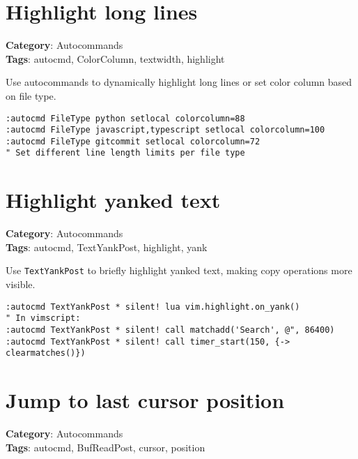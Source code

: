\section{Highlight long lines}

\textbf{Category}: Autocommands\\ \textbf{Tags}: autocmd, ColorColumn, textwidth, highlight
\vspace{0.5cm}

Use autocommands to dynamically highlight long lines or set color column based on file type.

\begin{Exa*}{}
\begin{Verbatim}[fontsize=\footnotesize, breaklines, breakanywhere]
:autocmd FileType python setlocal colorcolumn=88
:autocmd FileType javascript,typescript setlocal colorcolumn=100
:autocmd FileType gitcommit setlocal colorcolumn=72
" Set different line length limits per file type
\end{Verbatim}
\end{Exa*}

\section{Highlight yanked text}

\textbf{Category}: Autocommands\\ \textbf{Tags}: autocmd, TextYankPost, highlight, yank
\vspace{0.5cm}

Use {\footnotesize \Verb§TextYankPost§} to briefly highlight yanked text, making copy operations more visible.

\begin{Exa*}{}
\begin{Verbatim}[fontsize=\footnotesize, breaklines, breakanywhere]
:autocmd TextYankPost * silent! lua vim.highlight.on_yank()
" In vimscript: 
:autocmd TextYankPost * silent! call matchadd('Search', @", 86400)
:autocmd TextYankPost * silent! call timer_start(150, {-> clearmatches()})
\end{Verbatim}
\end{Exa*}

\section{Jump to last cursor position}

\textbf{Category}: Autocommands\\ \textbf{Tags}: autocmd, BufReadPost, cursor, position
\vspace{0.5cm}

